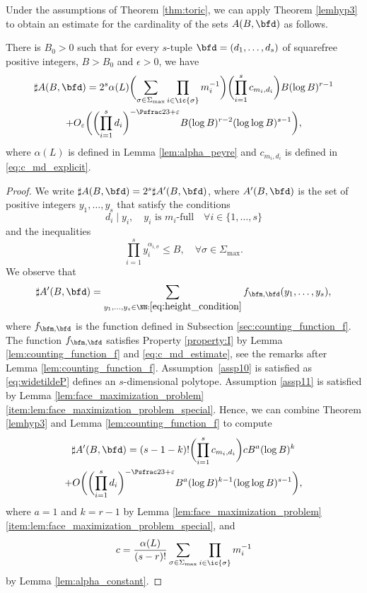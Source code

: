Under the assumptions of Theorem \ref{thm:toric}, we can apply Theorem \ref{lemhyp3}
to obtain an estimate for the cardinality of the sets $A(B,\bfd)$ as follows.
\begin{prop}
\label{prop:A(B,d)}
There is $B_0>0$ such that for every $s$-tuple $\bfd=(d_1,\dots, d_s)$
of squarefree positive integers, $B>B_0$ and $\epsilon>0$, we have
\begin{multline*}
\sharp A(B,\bfd)= 2^s
\alpha(L)
\biggl(\sum_{\sigma\in\Sigma_{\max}}\prod_{i\in\ic{\sigma}}m_i^{-1}\biggr)
\biggl(\prod_{i=1}^sc_{m_i,d_i}\biggr) B (\log B)^{r-1}
\\+O_{\varepsilon}\biggl(
\biggl(\prod_{i=1}^s d_i\biggr)^{-\Psfrac23+\varepsilon} B (\log B)^{r-2}(\log\log B)^{s-1}
\biggr),
\end{multline*}
where $\alpha(L)$ is defined in Lemma \ref{lem:alpha_peyre} and $c_{m_i,d_i}$
is defined in \eqref{eq:c_md_explicit}.
\end{prop}
\begin{proof}
We write $\sharp A(B,\bfd) = 2^{s}\sharp A'(B,\bfd)$, where
$A'(B,\bfd)$ is the set of positive integers $y_1,\dots,y_s$ that satisfy the conditions
\[
d_i \mid y_i, \quad y_i \text{ is $m_i$-full} \quad\forall i \in\{1,\dots,s\}
\]
and the inequalities
\begin{equation}
\label{eq:height_condition}
\prod_{i=1}^s y_i^{\alpha_{i,\sigma}} \leq B, \quad \forall \sigma\in\Sigma_{\max}.
\end{equation}
We observe that
\[
\sharp A'(B,\bfd)=
\sum_{ y_1,\dots, y_s\in\NN : \eqref{eq:height_condition} }
f_{\bfm, \bfd}(y_1,\dots,y_s),
\]
where $f_{\bfm, \bfd}$ is the function defined in Subsection \ref{sec:counting_function_f}.
The function $f_{\bfm, \bfd}$ satisfies Property \ref{property:I} by Lemma \ref{lem:counting_function_f} and \eqref{eq:c_md_estimate},
see the remarks after Lemma \ref{lem:counting_function_f}.
Assumption~\ref{assp10} is satisfied as \eqref{eq:widetildeP} defines an $s$-dimensional polytope.
Assumption \ref{assp11} is satisfied
by Lemma \ref{lem:face_maximization_problem}\eqref{item:lem:face_maximization_problem_special}.
Hence, we can combine Theorem \ref{lemhyp3} and Lemma \ref{lem:counting_function_f} to compute
\begin{multline}
\sharp A'(B,\bfd)= (s-1-k)! \biggl(\prod_{i=1}^sc_{m_i,d_i}\biggr) c B^{a}(\log B)^k
\\+O\biggl(
\biggl(\prod_{i=1}^s d_i\biggr)^{-\Psfrac23+\varepsilon} B^{a}(\log B)^{k-1}(\log\log B)^{s-1}
\biggr),
\end{multline}
where $a=1$ and $k=r-1$ by
Lemma \ref{lem:face_maximization_problem}\eqref{item:lem:face_maximization_problem_special}, and
\[
c=\frac{\alpha(L)}{(s-r)!}\sum_{\sigma\in\Sigma_{\max}}\prod_{i\in\ic{\sigma}}m_i^{-1}
\]
by Lemma \ref{lem:alpha_constant}.
\end{proof}

